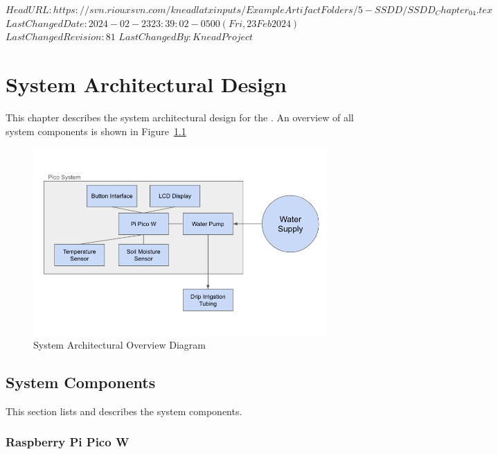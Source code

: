 \svnidlong
{$HeadURL: https://svn.riouxsvn.com/kneadlatxinputs/ExampleArtifactFolders/5-SSDD/SSDD_Chapter_04.tex $}
{$LastChangedDate: 2024-02-23 23:39:02 -0500 (Fri, 23 Feb 2024) $}
{$LastChangedRevision: 81 $}
{$LastChangedBy: KneadProject $}


\chapter{System Architectural Design}
\label{loc:SystemArchitecturalDesign}
% 

This chapter describes the system architectural design for the \ThisSystem. An overview of all system components is shown in Figure~\ref{fig:SYS-O}

\begin{figure}[htbp]
	\centering
		\includegraphics[width=6.5in]{./images/system_overview.png}
	\caption[System Architectural Overview]{System Architectural Overview Diagram}
	\label{fig:SYS-O}
\end{figure}

\section{System Components}
\label{loc:SystemComponents}
% 

This section lists and describes the system components.

\subsection{Raspberry Pi Pico W}

